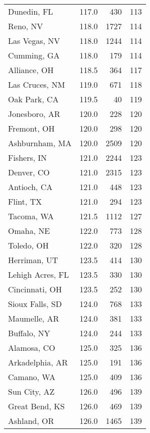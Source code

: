 \begin{longtable}{lrrr}
Dunedin, FL          &   117.0 &    430 &   113 \\
Reno, NV             &   118.0 &   1727 &   114 \\
Las Vegas, NV        &   118.0 &   1244 &   114 \\
Cumming, GA          &   118.0 &    179 &   114 \\
Alliance, OH         &   118.5 &    364 &   117 \\
Las Cruces, NM       &   119.0 &    671 &   118 \\
Oak Park, CA         &   119.5 &     40 &   119 \\
Jonesboro, AR        &   120.0 &    228 &   120 \\
Fremont, OH          &   120.0 &    298 &   120 \\
Ashburnham, MA       &   120.0 &   2509 &   120 \\
Fishers, IN          &   121.0 &   2244 &   123 \\
Denver, CO           &   121.0 &   2315 &   123 \\
Antioch, CA          &   121.0 &    448 &   123 \\
Flint, TX            &   121.0 &    294 &   123 \\
Tacoma, WA           &   121.5 &   1112 &   127 \\
Omaha, NE            &   122.0 &    773 &   128 \\
Toledo, OH           &   122.0 &    320 &   128 \\
Herriman, UT         &   123.5 &    414 &   130 \\
Lehigh Acres, FL     &   123.5 &    330 &   130 \\
Cincinnati, OH       &   123.5 &    252 &   130 \\
Sioux Falls, SD      &   124.0 &    768 &   133 \\
Maumelle, AR         &   124.0 &    381 &   133 \\
Buffalo, NY          &   124.0 &    244 &   133 \\
Alamosa, CO          &   125.0 &    325 &   136 \\
Arkadelphia, AR      &   125.0 &    191 &   136 \\
Camano, WA           &   125.0 &    409 &   136 \\
Sun City, AZ         &   126.0 &    496 &   139 \\
Great Bend, KS       &   126.0 &    469 &   139 \\
Ashland, OR          &   126.0 &   1465 &   139 \\

\end{longtable}
